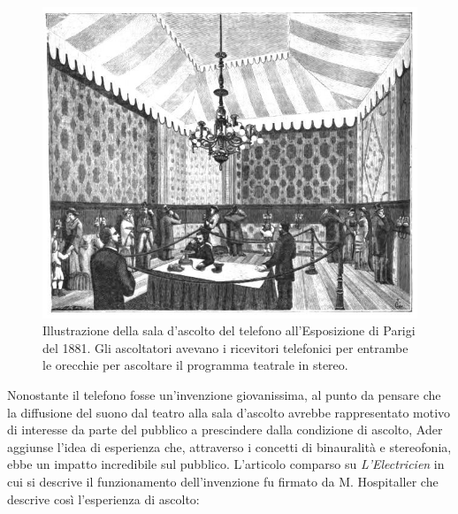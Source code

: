 \begin{figure}[t]
	\centering
	\includegraphics[width=0.99\columnwidth]{CAPITOLI/0300/IMG/1881opr4.jpg}
	\vspace{-10pt}
	\caption[]{Illustrazione della sala d'ascolto del telefono all'Esposizione di
	Parigi del 1881. Gli ascoltatori avevano i ricevitori telefonici per entrambe
	le orecchie per ascoltare il programma teatrale in stereo.}
	\label{fig:teatrophone2}
\end{figure}

Nonostante il telefono fosse un'invenzione giovanissima, al punto da pensare che
la diffusione del suono dal teatro alla sala d'ascolto avrebbe rappresentato
motivo di interesse da parte del pubblico a prescindere dalla condizione di
ascolto, Ader aggiunse l'idea di esperienza che, attraverso i concetti di
binauralità e stereofonia, ebbe un impatto incredibile sul pubblico. L'articolo
comparso su \emph{L'Electricien} in cui si descrive il funzionamento
dell'invenzione fu firmato da M. Hospitaller che descrive così l'esperienza di
ascolto:

